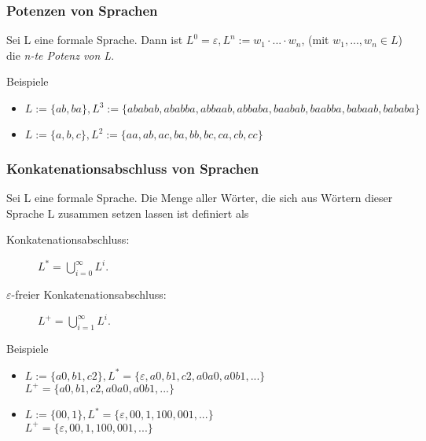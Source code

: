 \begin{frame}
  \frametitle{Potenzen von Sprachen}
  \begin{definition}
    Sei L eine formale Sprache. Dann ist $L^0 = \varepsilon, L^n := w_1 \cdot ... \cdot w_n$, (mit $w_1, ..., w_n \in L$) die \emph{n-te Potenz von L}.
  \end{definition}\pause
  \begin{exampleblock}{Beispiele}
    \begin{itemize}
      \item $L := \{ab, ba\}, L^3 := \{ababab, ababba, abbaab, abbaba, baabab, baabba, babaab, bababa\}$
      \item $L := \{a, b, c\}, L^2 := \{aa, ab, ac, ba, bb, bc, ca, cb, cc\}$
    \end{itemize}
  \end{exampleblock}
\end{frame}
\begin{frame}
  \frametitle{Konkatenationsabschluss von Sprachen}
  \begin{definition}
    Sei L eine formale Sprache. Die Menge aller Wörter, die sich aus Wörtern dieser Sprache L zusammen setzen lassen ist definiert als\\
    \begin{description}
      \item[Konkatenationsabschluss:] $L^* = \bigcup \limits^{\infty}_{i=0} L^i$.
      \item[$\varepsilon$-freier Konkatenationsabschluss:] $L^+ = \bigcup \limits^{\infty}_{i=1} L^i$.
    \end{description}
  \end{definition}\pause
  \begin{exampleblock}{Beispiele}
    \begin{itemize}
      \item $L := \{a0, b1, c2\}, L^* = \{\varepsilon, a0, b1, c2, a0a0, a0b1, ...\}$\\
             $L^+ = \{a0, b1, c2, a0a0, a0b1, ...\}$
      \item $L := \{00, 1\}, L^* = \{\varepsilon, 00, 1, 100, 001, ...\}$\\
             $L^+ = \{\varepsilon, 00, 1, 100, 001, ...\}$
    \end{itemize}
  \end{exampleblock}
\end{frame}

